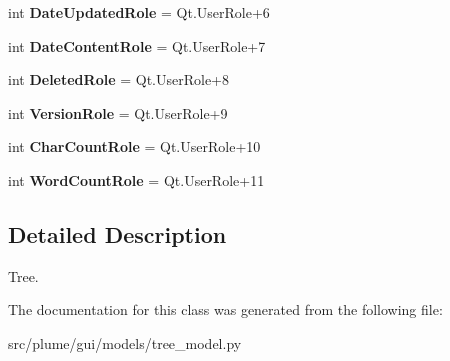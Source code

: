 \begin{DoxyCompactItemize}
\item 
int {\bfseries Date\+Updated\+Role} = Qt.\+User\+Role+6\hypertarget{classplume-creator_1_1src_1_1plume_1_1gui_1_1models_1_1tree__model_1_1_tree_model_a00fafb9e5f1ad70a1a82588f66e8bbfb}{}\label{classplume-creator_1_1src_1_1plume_1_1gui_1_1models_1_1tree__model_1_1_tree_model_a00fafb9e5f1ad70a1a82588f66e8bbfb}

\item 
int {\bfseries Date\+Content\+Role} = Qt.\+User\+Role+7\hypertarget{classplume-creator_1_1src_1_1plume_1_1gui_1_1models_1_1tree__model_1_1_tree_model_ac77242608ac3c105d8468f9b2d04b794}{}\label{classplume-creator_1_1src_1_1plume_1_1gui_1_1models_1_1tree__model_1_1_tree_model_ac77242608ac3c105d8468f9b2d04b794}

\item 
int {\bfseries Deleted\+Role} = Qt.\+User\+Role+8\hypertarget{classplume-creator_1_1src_1_1plume_1_1gui_1_1models_1_1tree__model_1_1_tree_model_a4a28672689f503f1309a127c38f2affc}{}\label{classplume-creator_1_1src_1_1plume_1_1gui_1_1models_1_1tree__model_1_1_tree_model_a4a28672689f503f1309a127c38f2affc}

\item 
int {\bfseries Version\+Role} = Qt.\+User\+Role+9\hypertarget{classplume-creator_1_1src_1_1plume_1_1gui_1_1models_1_1tree__model_1_1_tree_model_a5653928f282f5e0fe0a518fddffc97fa}{}\label{classplume-creator_1_1src_1_1plume_1_1gui_1_1models_1_1tree__model_1_1_tree_model_a5653928f282f5e0fe0a518fddffc97fa}

\item 
int {\bfseries Char\+Count\+Role} = Qt.\+User\+Role+10\hypertarget{classplume-creator_1_1src_1_1plume_1_1gui_1_1models_1_1tree__model_1_1_tree_model_a2c40d68b524e30720631c28ad7341dfc}{}\label{classplume-creator_1_1src_1_1plume_1_1gui_1_1models_1_1tree__model_1_1_tree_model_a2c40d68b524e30720631c28ad7341dfc}

\item 
int {\bfseries Word\+Count\+Role} = Qt.\+User\+Role+11\hypertarget{classplume-creator_1_1src_1_1plume_1_1gui_1_1models_1_1tree__model_1_1_tree_model_ae9d81d309b78c3dd2e81f84a9c341918}{}\label{classplume-creator_1_1src_1_1plume_1_1gui_1_1models_1_1tree__model_1_1_tree_model_ae9d81d309b78c3dd2e81f84a9c341918}

\end{DoxyCompactItemize}


\subsection{Detailed Description}
Tree. 

The documentation for this class was generated from the following file\+:\begin{DoxyCompactItemize}
\item 
src/plume/gui/models/tree\+\_\+model.\+py\end{DoxyCompactItemize}
